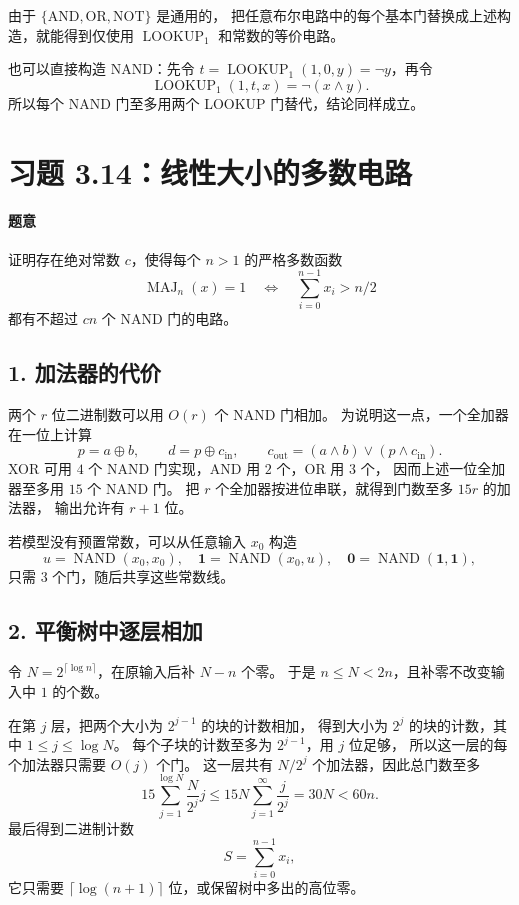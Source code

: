 \documentclass[UTF8,fontset=fandol,11pt,a4paper]{ctexart}
\newcommand{\NAND}{\operatorname{NAND}}
\newcommand{\MAJ}{\operatorname{MAJ}}
\newcommand{\LOOKUP}{\operatorname{LOOKUP}}
\begin{document}
由于 $\{\mathrm{AND},\mathrm{OR},\mathrm{NOT}\}$ 是通用的，
把任意布尔电路中的每个基本门替换成上述构造，就能得到仅使用
$\LOOKUP_1$ 和常数的等价电路。

也可以直接构造 NAND：先令 $t=\LOOKUP_1(1,0,y)=\neg y$，再令
\[
 \LOOKUP_1(1,t,x)=\neg(x\land y).
\]
所以每个 NAND 门至多用两个 LOOKUP 门替代，结论同样成立。

\section{习题 3.14：线性大小的多数电路}

\paragraph{题意}
证明存在绝对常数 $c$，使得每个 $n>1$ 的严格多数函数
\[
 \MAJ_n(x)=1\quad\Longleftrightarrow\quad
 \sum_{i=0}^{n-1}x_i>n/2
\]
都有不超过 $cn$ 个 NAND 门的电路。

\subsection*{1. 加法器的代价}
两个 $r$ 位二进制数可以用 $O(r)$ 个 NAND 门相加。
为说明这一点，一个全加器在一位上计算
\[
 p=a\oplus b,\qquad d=p\oplus c_{\mathrm{in}},\qquad
 c_{\mathrm{out}}=(a\land b)\lor(p\land c_{\mathrm{in}}).
\]
XOR 可用 $4$ 个 NAND 门实现，AND 用 $2$ 个，OR 用 $3$ 个，
因而上述一位全加器至多用 $15$ 个 NAND 门。
把 $r$ 个全加器按进位串联，就得到门数至多 $15r$ 的加法器，
输出允许有 $r+1$ 位。

若模型没有预置常数，可以从任意输入 $x_0$ 构造
\[
 u=\NAND(x_0,x_0),\quad
 \mathbf 1=\NAND(x_0,u),\quad
 \mathbf 0=\NAND(\mathbf 1,\mathbf 1),
\]
只需 $3$ 个门，随后共享这些常数线。

\subsection*{2. 平衡树中逐层相加}
令 $N=2^{\lceil\log n\rceil}$，在原输入后补 $N-n$ 个零。
于是 $n\le N<2n$，且补零不改变输入中 $1$ 的个数。

在第 $j$ 层，把两个大小为 $2^{j-1}$ 的块的计数相加，
得到大小为 $2^j$ 的块的计数，其中 $1\le j\le\log N$。
每个子块的计数至多为 $2^{j-1}$，用 $j$ 位足够，
所以这一层的每个加法器只需要 $O(j)$ 个门。
这一层共有 $N/2^j$ 个加法器，因此总门数至多
\[
 15\sum_{j=1}^{\log N}\frac{N}{2^j}j
 \le15N\sum_{j=1}^{\infty}\frac{j}{2^j}
 =30N<60n.
\]
最后得到二进制计数
\[
 S=\sum_{i=0}^{n-1}x_i,
\]
它只需要 $\lceil\log(n+1)\rceil$ 位，或保留树中多出的高位零。
\end{document}
